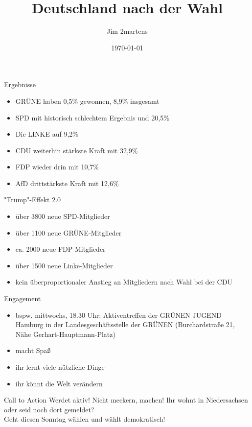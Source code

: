 \documentclass{beamer}
\begin{document}
\author{Jim 2martens}
\title{Deutschland nach der Wahl}
\date{\today}

\begin{frame}
    \titlepage
\end{frame}

\begin{frame}{Ergebnisse}
    \begin{itemize}
        \item GRÜNE haben 0,5\% gewonnen, 8,9\% insgesamt
        \vfill
        \item SPD mit historisch schlechtem Ergebnis und 20,5\%
        \vfill
        \item Die LINKE auf 9,2\%
        \vfill
        \item CDU weiterhin stärkste Kraft mit 32,9\%
        \vfill
        \item FDP wieder drin mit 10,7\%
        \vfill
        \item AfD drittstärkste Kraft mit 12,6\%
    \end{itemize}
\end{frame}

\begin{frame}{"Trump"-Effekt 2.0}
    \begin{itemize}
        \item über 3800 neue SPD-Mitglieder
        \vfill
        \item über 1100 neue GRÜNE-Mitglieder
        \vfill
        \item ca. 2000 neue FDP-Mitglieder
        \vfill
        \item über 1500 neue Linke-Mitglieder
        \vfill
        \item kein überproportionaler Anstieg an Mitgliedern nach Wahl bei der CDU
    \end{itemize}
\end{frame}

\begin{frame}{Engagement}
    \begin{itemize}
        \item bspw. mittwochs, 18.30 Uhr: Aktiventreffen der GRÜNEN JUGEND Hamburg
        in der Landesgeschäftsstelle der GRÜNEN (Burchardstraße 21, Nähe Gerhart-Hauptmann-Platz)
        \vfill
        \item macht Spaß
        \vfill
        \item ihr lernt viele nützliche Dinge
        \vfill
        \item ihr könnt die Welt verändern
    \end{itemize}
\end{frame}

\begin{frame}{Call to Action}
    \centering
    Werdet aktiv! Nicht meckern, machen!
    \vfill
    Ihr wohnt in Niedersachsen oder seid noch dort gemeldet?\\
    Geht diesen Sonntag wählen und wählt demokratisch!
\end{frame}
\end{document}
